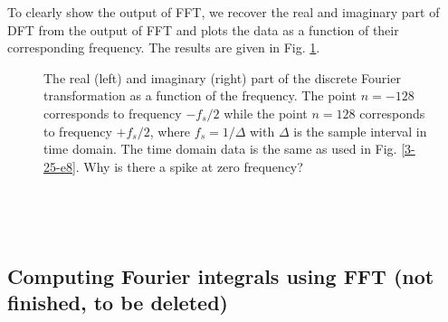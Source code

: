 \documentclass{article}
\begin{document}
To clearly show the output of FFT, we recover the real and imaginary part of
DFT from the output of FFT and plots the data as a function of their
corresponding frequency. The results are given in Fig. \ref{8-27-p1}.

\begin{figure}[h]
  \caption{\label{8-27-p1}The real (left) and imaginary (right) part of the
  discrete Fourier transformation as a function of the frequency. The point $n
  = - 128$ corresponds to frequency $- f_s / 2$ while the point $n = 128$
  corresponds to frequency $+ f_s / 2$, where $f_s = 1 / \Delta$ with $\Delta$
  is the sample interval in time domain. The time domain data is the same as
  used in Fig. \ref{3-25-e8}. Why is there a spike at zero frequency?}
\end{figure}

\

\

\subsection{Computing Fourier integrals using FFT (not finished, to be
deleted)}
\end{document}
